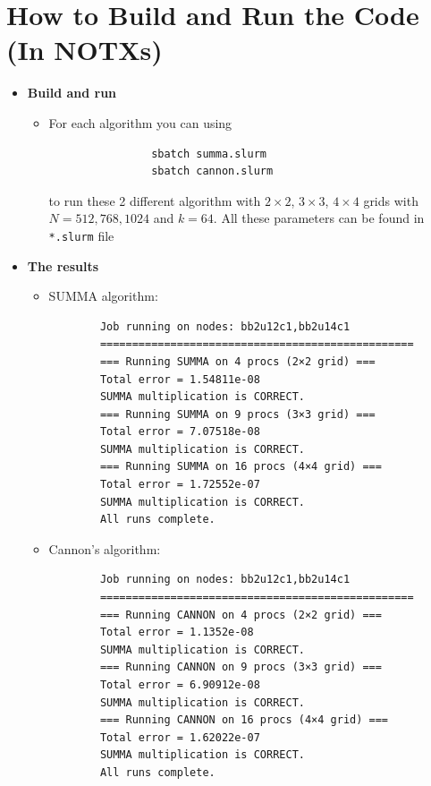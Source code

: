 \documentclass[11pt]{article}
\begin{document}
\newpage

\section{How to Build and Run the Code (In NOTXs)}
\begin{itemize}
    \item \textbf{Build and run}
        \begin{itemize}
            \item For each algorithm you can using
            \begin{verbatim}
                sbatch summa.slurm
                sbatch cannon.slurm
            \end{verbatim}
            to run these 2 different algorithm with $2 \times 2$, $3 \times 3$, $4 \times 4$ grids with $N = 512, 768, 1024$ and $k = 64$. All these parameters can be found in \verb|*.slurm| file
        \end{itemize}
    \item \textbf{The results}
        \begin{itemize}
            \item SUMMA algorithm:
            \begin{verbatim}
        Job running on nodes: bb2u12c1,bb2u14c1
        =================================================
        === Running SUMMA on 4 procs (2×2 grid) ===
        Total error = 1.54811e-08
        SUMMA multiplication is CORRECT.
        === Running SUMMA on 9 procs (3×3 grid) ===
        Total error = 7.07518e-08
        SUMMA multiplication is CORRECT.
        === Running SUMMA on 16 procs (4×4 grid) ===
        Total error = 1.72552e-07
        SUMMA multiplication is CORRECT.
        All runs complete.
            \end{verbatim}
            \item Cannon's algorithm:
            \begin{verbatim}
        Job running on nodes: bb2u12c1,bb2u14c1
        =================================================
        === Running CANNON on 4 procs (2×2 grid) ===
        Total error = 1.1352e-08
        SUMMA multiplication is CORRECT.
        === Running CANNON on 9 procs (3×3 grid) ===
        Total error = 6.90912e-08
        SUMMA multiplication is CORRECT.
        === Running CANNON on 16 procs (4×4 grid) ===
        Total error = 1.62022e-07
        SUMMA multiplication is CORRECT.
        All runs complete.
            \end{verbatim}
        \end{itemize}
\end{itemize}
\end{document}
